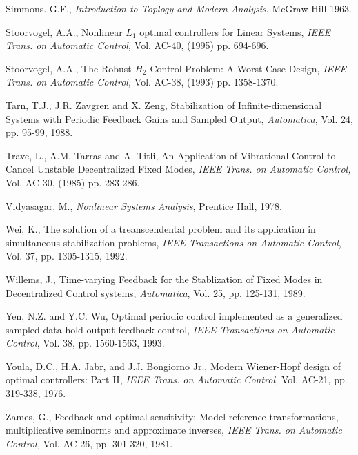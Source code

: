\begin{thebibliography}{99}
Simmons. G.F.,  {\em Introduction  to Toplogy and  Modern Analysis},  McGraw-Hill
1963.

Stoorvogel, A.A.,  Nonlinear $L_1$ optimal  controllers  for Linear Systems,
{\em IEEE Trans. on Automatic Control,} Vol. AC-40, (1995) pp. 694-696.

Stoorvogel, A.A., The  Robust $H_2$ Control Problem: A Worst-Case Design,
{\em IEEE Trans. on Automatic Control,} Vol. AC-38, (1993) pp. 1358-1370.

Tarn, T.J., J.R. Zavgren  and X. Zeng, Stabilization of Infinite-dimensional Systems
with Periodic Feedback  Gains and  Sampled Output, {\em Automatica}, Vol. 24, pp.
95-99, 1988.


Trave, L., A.M. Tarras and  A. Titli,  An Application of  Vibrational  Control to
Cancel  Unstable  Decentralized  Fixed Modes, {\em IEEE Trans. on Automatic Control,}
Vol. AC-30, (1985) pp. 283-286.


Vidyasagar, M.,  {\em Nonlinear Systems Analysis},  Prentice
Hall, 1978.


Wei, K., The  solution of  a  treanscendental problem and its  application  in
simultaneous stabilization problems,  {\em IEEE Transactions on Automatic Control},
Vol. 37, pp. 1305-1315, 1992.


Willems, J., Time-varying  Feedback  for the  Stablization  of Fixed Modes in
Decentralized Control  systems, {\em Automatica}, Vol. 25, pp. 125-131, 1989.


Yen, N.Z. and Y.C. Wu, Optimal periodic control implemented as a
generalized sampled-data hold output feedback control,  {\em IEEE
Transactions on Automatic Control}, Vol. 38, pp. 1560-1563, 1993.


 Youla, D.C., H.A. Jabr, and J.J. Bongiorno Jr., Modern
Wiener-Hopf design of optimal controllers: Part II, {\em IEEE Trans. on Automatic
Control,} Vol. AC-21, pp. 319-338, 1976.



 Zames, G., Feedback  and  optimal sensitivity: Model reference
transformations, multiplicative  seminorms and  approximate  inverses, {\em IEEE
Trans. on Automatic Control,} Vol. AC-26, pp. 301-320, 1981.




\end{thebibliography}

